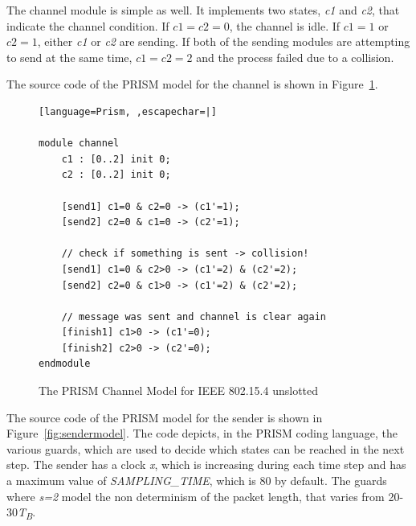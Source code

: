 \documentclass[
a4paper,
12pt
]{scrartcl}
\begin{document}
The channel module is simple as well. It implements two states, \textit{c1} and \textit{c2}, that indicate the channel condition. If $c1=c2=0$, the channel is idle. If $c1=1$ or $c2=1$, either \textit{c1} or \textit{c2} are sending. If both of the sending modules are attempting to send at the same time, $c1=c2=2$ and the process failed due to a collision.

The source code of the PRISM model for the channel is shown in Figure~\ref{fig:channelmodel}.

\begin{figure}[ht!]
\begin{lstlisting}[language=Prism, ,escapechar=|]

module channel
	c1 : [0..2] init 0;
	c2 : [0..2] init 0;

	[send1] c1=0 & c2=0 -> (c1'=1);
	[send2] c2=0 & c1=0 -> (c2'=1);

	// check if something is sent -> collision!
	[send1] c1=0 & c2>0 -> (c1'=2) & (c2'=2);
	[send2] c2=0 & c1>0 -> (c1'=2) & (c2'=2);

	// message was sent and channel is clear again
	[finish1] c1>0 -> (c1'=0);
	[finish2] c2>0 -> (c2'=0);
endmodule

\end{lstlisting}
\caption{The PRISM Channel Model for IEEE 802.15.4 unslotted}
\label{fig:channelmodel}
\end{figure}

The source code of the PRISM model for the sender is shown in Figure~\ref{fig:sendermodel}. The code depicts, in the PRISM coding language, the various guards, which are used to decide which states can be reached in the next step. The sender has a clock \textit{x}, which is increasing during each time step and has a maximum value of \textit{SAMPLING\_TIME}, which is 80 by default. The guards where \textit{s=2} model the non determinism of the packet length, that varies from 20-30\textit{T\textsubscript{B}}.
\end{document}
